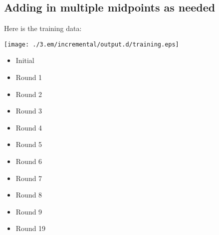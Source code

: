\documentclass{book}
\begin{document}
\subsection{Adding in multiple midpoints as needed}
\label{sec-3_4_4}


Here is the training data:

\texttt{[image: ./3.em/incremental/output.d/training.eps]}
\begin{itemize}

\item Initial\\
\label{sec-3_4_4_1}%



\item Round 1\\
\label{sec-3_4_4_2}%


\item Round 2\\
\label{sec-3_4_4_3}%


\item Round 3\\
\label{sec-3_4_4_4}%


\item Round 4\\
\label{sec-3_4_4_5}%


\item Round 5\\
\label{sec-3_4_4_6}%


\item Round 6\\
\label{sec-3_4_4_7}%


\item Round 7\\
\label{sec-3_4_4_8}%


\item Round 8\\
\label{sec-3_4_4_9}%


\item Round 9\\
\label{sec-3_4_4_10}%


\item Round 19\\
\label{sec-3_4_4_11}%




\end{itemize}
\end{document}
